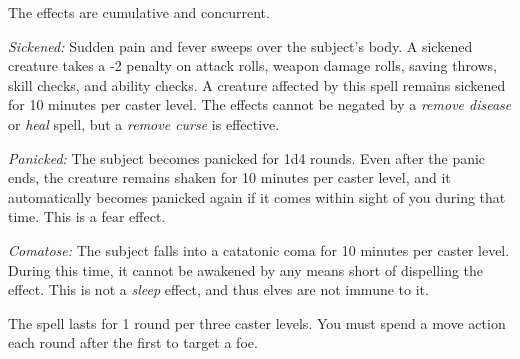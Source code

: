 The effects are cumulative and concurrent.

\textit{Sickened:} Sudden pain and fever sweeps over the subject's body. A sickened 
creature takes a -2 penalty on attack rolls, weapon damage rolls, saving throws, 
skill checks, and ability checks. A creature affected by this spell remains sickened 
for 10 minutes per caster level. The effects cannot be negated by a \textit{remove 
disease} or \textit{heal} spell, but a \textit{remove curse} is effective.

\textit{Panicked:} The subject becomes panicked for 1d4 rounds. Even after the 
panic ends, the creature remains shaken for 10 minutes per caster level, and it 
automatically becomes panicked again if it comes within sight of you during that 
time. This is a fear effect.

\textit{Comatose:} The subject falls into a catatonic coma for 10 minutes per caster 
level. During this time, it cannot be awakened by any means short of dispelling 
the effect. This is not a \textit{sleep} effect, and thus elves are not immune 
to it.

The spell lasts for 1 round per three caster levels. You must spend a move action 
each round after the first to target a foe.





